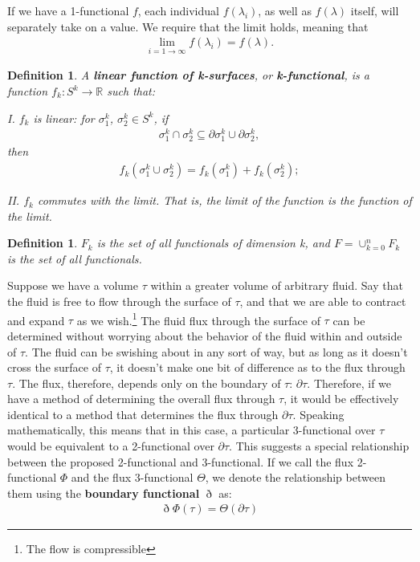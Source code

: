 \documentclass{book}
\newtheorem{defn}[equation]{Definition}
\begin{document}
If we have a 1-functional $f$, each individual $f(\lambda_i)$, as well as $f(\lambda)$ itself, will separately take on a value. We require that the limit holds, meaning that \begin{gather} \lim_{i = 1 \to \infty} f(\lambda_i) = f(\lambda). \end{gather}



\begin{defn}
	A \textbf{linear function of k-surfaces}, or \textbf{k-functional}, is a function $f_k : S^k \to \mathbb{R}$ such that:
	
	I. $f_k$ is linear: for $\sigma^k_1$, $\sigma^k_2 \in S^k$, if \begin{gather}\sigma^k_1 \cap \sigma^k_2 \subseteq \partial \sigma^k_1 \cup \partial \sigma^k_2,\end{gather} then \begin{gather}f_k(\sigma^k_1\cup \sigma^k_2) = f_k(\sigma^k_1) + f_k(\sigma^k_2); \end{gather}
	
	II. $f_k$ commutes with the limit. That is, the limit of the function is the function of the limit. 
\end{defn}



\begin{defn}
	$F_k$ is the set of all functionals of dimension k, and $F = \cup_{k=0}^nF_k$ is the set of all functionals. 
\end{defn}





Suppose we have a volume $\tau$ within a greater volume of arbitrary fluid. Say that the fluid is free to flow through the surface of $\tau$, and that we are able to contract and expand $\tau$ as we wish.\footnote{The flow is compressible} The fluid flux through the surface of $\tau$ can be determined without worrying about the behavior of the fluid within and outside of $\tau$. The fluid can be swishing about in any sort of way, but as long as it doesn't cross the surface of $\tau$, it doesn't make one bit of difference as to the flux through $\tau$. The flux, therefore, depends only on the boundary of $\tau$: $\partial\tau$. Therefore, if we have a method of determining the overall flux through $\tau$, it would be effectively identical to a method that determines the flux through $\partial\tau$. Speaking mathematically, this means that in this case, a particular 3-functional over $\tau$ would be equivalent to a 2-functional over $\partial\tau$. This suggests a special relationship between the proposed 2-functional and 3-functional. If we call the flux 2-functional $\Phi$ and the flux 3-functional $\Theta$, we denote the relationship between them using the \textbf{boundary functional} $\eth$ as: \begin{gather} \eth\Phi(\tau) = \Theta(\partial\tau) \end{gather}
\end{document}

